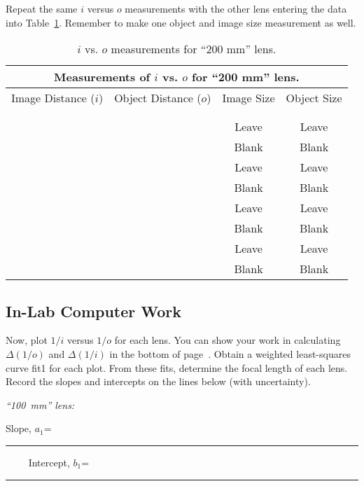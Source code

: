 %

\newpage
Repeat the same $i$ versus $o$ measurements with the other lens entering
the data into Table~\ref{tab:OP:238}.  Remember to
make one object and image size measurement as well.
\begin{table}[h]
\begin{center}
\begin{tabular}{|c|c|c|c|}
\hline
\multicolumn{4}{|c|}{Measurements of $i$ vs. $o$ for ``200 mm'' lens.} \\
\hline
Image Distance ($i$) & Object Distance ($o$) & Image Size & Object Size \\
\hline
\hspace*{3cm} & \hspace*{3cm} & \hspace*{3cm} & \hspace*{3cm} \\
& & &  \\
\hline
& & Leave & Leave  \\
& & Blank & Blank \\
\hline
& & Leave & Leave \\
& & Blank & Blank \\
\hline
& & Leave & Leave \\
& & Blank & Blank \\
\hline
& & Leave & Leave \\
& & Blank & Blank \\
\hline
\end{tabular}
\end{center}
\caption{$i$ vs. $o$ measurements for ``200 mm'' lens.}
\label {tab:OP:238}
\end{table}

\subsection{In-Lab Computer Work}
\noindent
Now, plot $1/i$ versus $1/o$ for each lens. You can show your work in
calculating $\Delta(1/o)$ and $\Delta(1/i)$ in the bottom of
page~\pageref{tab:OP:136}. Obtain a weighted least-squares curve fit1 for each
plot. From these fits, determine the focal length of each lens. Record the
slopes and intercepts on the lines below (with uncertainty).

\noindent
{\it ``100~mm'' lens:}
\begin{center}
Slope, $a_1$=~\rule{3cm}{.1mm} ~~~~
Intercept, $b_1$=~\rule{3cm}{.1mm}
\end{center}
\vspace*{.5cm}


